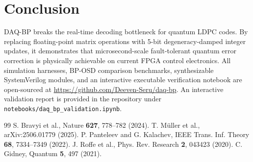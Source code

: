 \documentclass[aps,prxquantum,reprint,twocolumn,superscriptaddress,nofootinbib]{revtex4-2}
\begin{document}
\section{Conclusion}
DAQ-BP breaks the real-time decoding bottleneck for quantum LDPC codes. By replacing floating-point matrix operations with 5-bit degeneracy-damped integer updates, it demonstrates that microsecond-scale fault-tolerant quantum error correction is physically achievable on current FPGA control electronics. All simulation harnesses, BP-OSD comparison benchmarks, synthesizable SystemVerilog modules, and an interactive executable verification notebook are open-sourced at \url{https://github.com/Deeven-Seru/daq-bp}. An interactive validation report is provided in the repository under \texttt{notebooks/daq\_bp\_validation.ipynb}.

\begin{thebibliography}{99}
 S. Bravyi et al., Nature \textbf{627}, 778–782 (2024).
 T. M\"uller et al., arXiv:2506.01779 (2025).
 P. Panteleev and G. Kalachev, IEEE Trans. Inf. Theory \textbf{68}, 7334–7349 (2022).
 J. Roffe et al., Phys. Rev. Research \textbf{2}, 043423 (2020).
 C. Gidney, Quantum \textbf{5}, 497 (2021).
\end{thebibliography}
\end{document}
